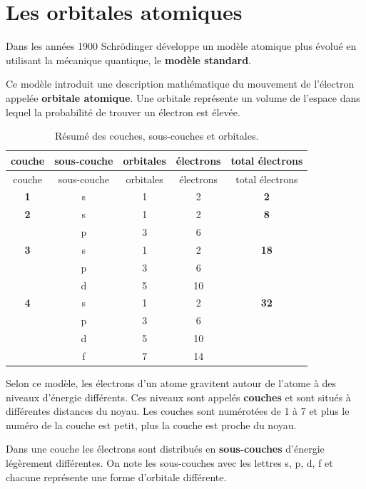 \documentclass[
  11pt,
  a4paper,
  openany]{book}
\begin{document}
\hypertarget{les-orbitales-atomiques}{%
\section{Les orbitales atomiques}\label{les-orbitales-atomiques}}

Dans les années 1900 Schrödinger développe un modèle atomique plus évolué en utilisant la mécanique quantique, le \textbf{modèle standard}.

Ce modèle introduit une description mathématique du mouvement de l'électron appelée \textbf{orbitale atomique}. Une orbitale représente un volume de l'espace dans lequel la probabilité de trouver un électron est élevée.

\begin{longtable}[]{@{}ccccc@{}}
\caption{\label{tab:couches-sous-couches-orbitales} Résumé des couches, sous-couches et orbitales.}\tabularnewline
\toprule()
couche & sous-couche & orbitales & électrons & total électrons \\
\midrule()
\endfirsthead
\toprule()
couche & sous-couche & orbitales & électrons & total électrons \\
\midrule()
\endhead
\textbf{1} & s & 1 & 2 & \textbf{2} \\
\textbf{2} & s & 1 & 2 & \textbf{8} \\
& p & 3 & 6 & \\
\textbf{3} & s & 1 & 2 & \textbf{18} \\
& p & 3 & 6 & \\
& d & 5 & 10 & \\
\textbf{4} & s & 1 & 2 & \textbf{32} \\
& p & 3 & 6 & \\
& d & 5 & 10 & \\
& f & 7 & 14 & \\
\bottomrule()
\end{longtable}

Selon ce modèle, les électrons d'un atome gravitent autour de l'atome à des niveaux d'énergie différents. Ces niveaux sont appelés \textbf{couches} et sont situés à différentes distances du noyau. Les couches sont numérotées de 1 à 7 et plus le numéro de la couche est petit, plus la couche est proche du noyau.

Dans une couche les électrons sont distribués en \textbf{sous-couches} d'énergie légèrement différentes. On note les sous-couches avec les lettres s, p, d, f et chacune représente une forme d'orbitale différente.
\end{document}
